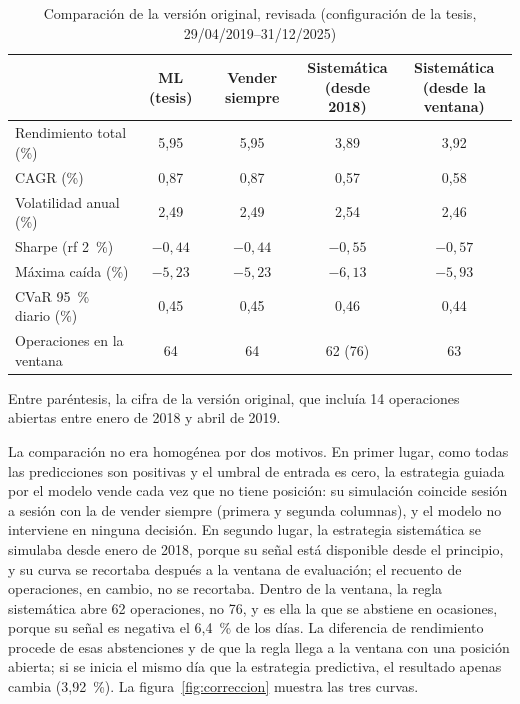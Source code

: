\documentclass[11pt,a4paper]{article}
\begin{document}
\begin{table}[!htbp]
\centering
\caption{Comparación de la versión original, revisada (configuración de la tesis, 29/04/2019--31/12/2025)}\label{tab:correccion}
\small
\begin{tabular}{@{}lcccc@{}}
\toprule
& ML (tesis) & Vender siempre & \makecell{Sistemática\\(desde 2018)} & \makecell{Sistemática\\(desde la ventana)} \\
\midrule
Rendimiento total (\%) & 5,95 & 5,95 & 3,89 & 3,92 \\
CAGR (\%) & 0,87 & 0,87 & 0,57 & 0,58 \\
Volatilidad anual (\%) & 2,49 & 2,49 & 2,54 & 2,46 \\
Sharpe (rf 2~\%) & $-0{,}44$ & $-0{,}44$ & $-0{,}55$ & $-0{,}57$ \\
Máxima caída (\%) & $-5{,}23$ & $-5{,}23$ & $-6{,}13$ & $-5{,}93$ \\
CVaR 95~\% diario (\%) & 0,45 & 0,45 & 0,46 & 0,44 \\
Operaciones en la ventana & 64 & 64 & 62 (76) & 63 \\
\bottomrule
\end{tabular}
\par\smallskip\raggedright\footnotesize Entre paréntesis, la cifra de la versión original, que incluía 14 operaciones abiertas entre enero de 2018 y abril de 2019.
\end{table}

La comparación no era homogénea por dos motivos. En primer lugar, como todas las predicciones son positivas y el umbral de entrada es cero, la estrategia guiada por el modelo vende cada vez que no tiene posición: su simulación coincide sesión a sesión con la de vender siempre (primera y segunda columnas), y el modelo no interviene en ninguna decisión. En segundo lugar, la estrategia sistemática se simulaba desde enero de 2018, porque su señal está disponible desde el principio, y su curva se recortaba después a la ventana de evaluación; el recuento de operaciones, en cambio, no se recortaba. Dentro de la ventana, la regla sistemática abre 62 operaciones, no 76, y es ella la que se abstiene en ocasiones, porque su señal es negativa el 6,4~\% de los días. La diferencia de rendimiento procede de esas abstenciones y de que la regla llega a la ventana con una posición abierta; si se inicia el mismo día que la estrategia predictiva, el resultado apenas cambia (3,92~\%). La figura~\ref{fig:correccion} muestra las tres curvas.
\end{document}
